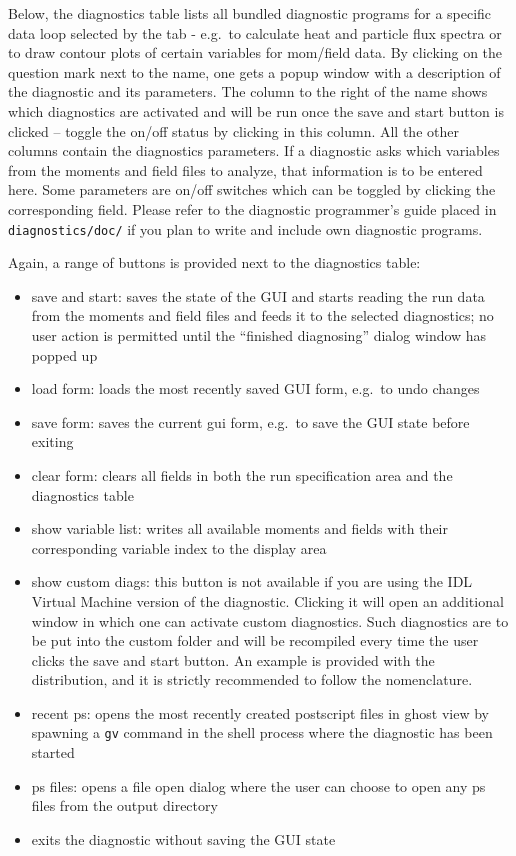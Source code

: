 \documentclass[12pt]{article}
\begin{document}
Below, the diagnostics table lists all bundled diagnostic
programs for a specific data loop selected by the tab
- e.g.~to calculate heat and particle flux spectra or
to draw contour plots of certain variables for mom/field data.
By clicking on the question mark next to the name, one
gets a popup window with a description of the diagnostic and its
parameters. The column to the right of the name shows which
diagnostics are activated and will be run once the save and start
button is clicked -- toggle the on/off status by clicking in this
column. All the other columns contain the diagnostics parameters.
If a diagnostic asks which variables from the moments and field
files to analyze, that information is to be entered here. Some
parameters are on/off switches which can be toggled by clicking
the corresponding field. Please refer to the diagnostic
programmer's guide placed in \verb|diagnostics/doc/| if you plan
to write and include own diagnostic programs.

Again, a range of buttons is provided next to the diagnostics
table:
\begin{itemize}
\item save and start: saves the state of the GUI and starts
reading the run data from the moments and field files and feeds it
to the selected diagnostics; no user action is permitted until the
``finished diagnosing'' dialog window has popped up
\item load form: loads the most recently saved GUI form,
e.g.~to undo changes
\item save form: saves the current gui form, e.g.~to save the GUI
state before exiting
\item clear form: clears all fields in both
the run specification area and the diagnostics table
\item show
variable list: writes all available moments and fields with their
corresponding variable index to the display area
\item show custom diags: this button is not available if you
are using the IDL
Virtual Machine version of the \gene diagnostic. Clicking it will
open an additional window in which one can activate custom
diagnostics. Such diagnostics are to be put into the custom folder
and will be recompiled every time the user clicks the save and
start button. An example is provided with the distribution, and it
is strictly recommended to follow the nomenclature.
\item recent ps: opens the most recently created postscript
files in ghost view
by spawning a \verb|gv| command in the shell process where the
diagnostic has been started
\item ps files: opens a file open dialog where the user can
choose to open any ps files from the
output directory
\item exits the diagnostic without saving the GUI state
\end{itemize}
\end{document}
